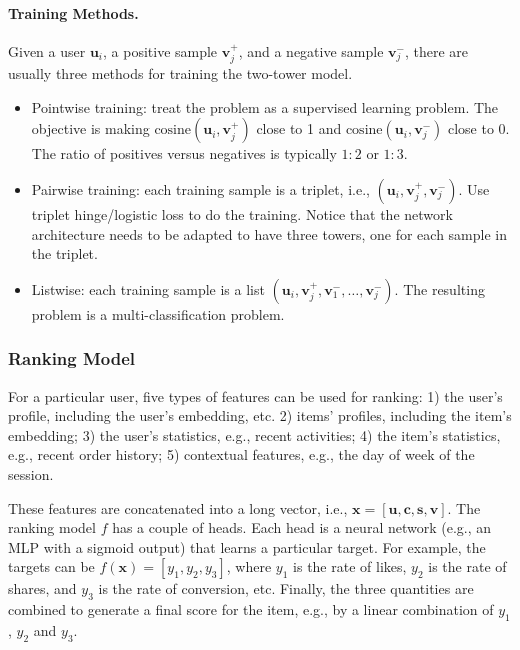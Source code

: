         \paragraph{Training Methods.}
            Given a user $\bm{u}_i$, a positive sample $\bm{v}_j^+$, and a negative sample $\bm{v}_j^-$, there are usually three methods for training the two-tower model.
            \begin{itemize}
                \item Pointwise training: treat the problem as a supervised learning problem. 
                The objective is making $\text{cosine}(\bm{u}_i, \bm{v}_j^+)$ close to 1 and $\text{cosine}(\bm{u}_i, \bm{v}_j^-)$ close to 0. 
                The ratio of positives versus negatives is typically $1:2$ or $1:3$.
                
                \item Pairwise training: each training sample is a triplet, i.e., $(\bm{u}_i, \bm{v}_j^+, \bm{v}_j^-)$. Use triplet hinge/logistic loss to do the training. 
                Notice that the network architecture needs to be adapted to have three towers, one for each sample in the triplet. 
                
                \item Listwise: each training sample is a list $(\bm{u}_i, \bm{v}_j^+, \bm{v}_1^-, \ldots, \bm{v}_j^-)$. The resulting problem is a multi-classification problem.
            \end{itemize}
    

    \subsubsection{Ranking Model}
        For a particular user, five types of features can be used for ranking: 1) the user's profile, including the user's embedding, etc. 2) items' profiles, including the item's embedding; 3) the user's statistics, e.g., recent activities; 4) the item's statistics, e.g., recent order history; 5) contextual features, e.g., the day of week of the session. 
        
        These features are concatenated into a long vector, i.e., $\bm{x} = [\bm{u}, \bm{c}, \bm{s}, \bm{v}]$.
        The ranking model $f$ has a couple of heads. Each head is a neural network (e.g., an MLP with a sigmoid output) that learns a particular target.
        For example, the targets can be $f(\bm{x}) = [y_1, y_2, y_3]$, where $y_1$ is the rate of likes, $y_2$ is the rate of shares, and $y_3$ is the rate of conversion, etc. 
        Finally, the three quantities are combined to generate a final score for the item, e.g., by a linear combination of $y_1$, $y_2$ and $y_3$.

